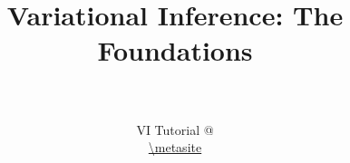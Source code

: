 \documentclass[14pt]{beamer}
\title[VI]{Variational Inference: The Foundations}
\date{}
\author[VI Tutorial @ \metahost]{ \metaauthor \\ 
~\\
VI Tutorial @ \metahost \\
\url{\metasite}
}
\begin{document}
\frame{\titlepage}



\end{document}
